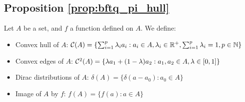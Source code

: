 \subsection{Proposition \ref{prop:bftq_pi_hull}}
\begin{definition}
Let $A$ be a set, and $f$ a function defined on $A$. We define:

\begin{itemize}
    \item Convex hull of $A$: $\mathcal{C}(A) = \{\sum_{i=1}^p \lambda_i a_i: a_i\in A, \lambda_i\in\mathbb{R}^+, \sum_{i=1}^p \lambda_i = 1, p\in\mathbb{N}\}$
    \item Convex edges of $A$: $\mathcal{C}^2(A) = \{\lambda a_1 + (1-\lambda)a_2: a_1, a_2\in A, \lambda\in[0, 1]\}$
    \item Dirac distributions of $A$: $\delta(A) = \{\delta(a-a_0): a_0\in A\}$ 
    \item Image of $A$ by $f$: $f(A) = \{f(a): a\in A\}$
\end{itemize}
\end{definition}

